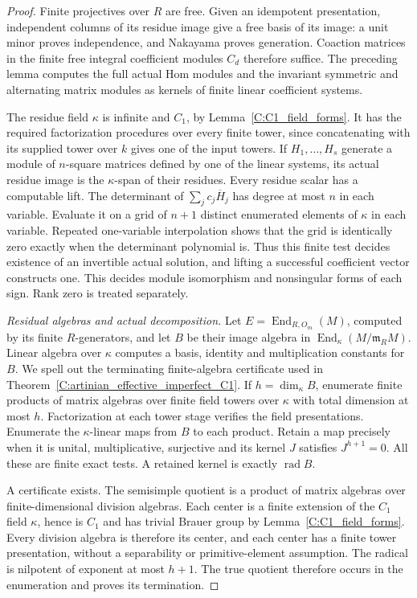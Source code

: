 \begin{proof}
Finite projectives over $R$ are free.
Given an idempotent presentation, independent
columns of its residue image give a free basis
of its image: a unit minor proves independence,
and Nakayama proves generation.
Coaction matrices in the finite free integral
coefficient modules $C_d$ therefore suffice.
The preceding lemma computes the full actual
Hom modules and the invariant symmetric and
alternating matrix modules as kernels of
finite linear coefficient systems.

The residue field $\kappa$ is infinite and
$C_1$, by Lemma~\ref{C:C1_field_forms}.
It has the required factorization procedures
over every finite tower, since concatenating
with its supplied tower over $k$ gives one
of the input towers.
If $H_1,\ldots,H_s$ generate a module of
$n$-square matrices defined by one of the
linear systems, its actual residue image
is the $\kappa$-span of their residues.
Every residue scalar has a computable lift.
The determinant of $\sum_jc_j\overline H_j$
has degree at most $n$ in each variable.
Evaluate it on a grid of $n+1$ distinct
enumerated elements of $\kappa$ in each
variable.  Repeated one-variable interpolation
shows that the grid is identically zero
exactly when the determinant polynomial is.
Thus this finite test decides existence of
an invertible actual solution, and lifting
a successful coefficient vector constructs
one.  This decides module isomorphism and
nonsingular forms of each sign.  Rank zero
is treated separately.

\emph{Residual algebras and actual decomposition.}
Let $E=\operatorname{End}_{R,O_m}(M)$, computed
by its finite $R$-generators, and let $B$ be
their image algebra in
$\operatorname{End}_{\kappa}(M/\mathfrak m_RM)$.
Linear algebra over $\kappa$ computes a basis,
identity and multiplication constants for $B$.
We spell out the terminating finite-algebra
certificate used in
Theorem~\ref{C:artinian_effective_imperfect_C1}.
If $h=\dim_\kappa B$, enumerate finite products
of matrix algebras over finite field towers
over $\kappa$ with total dimension at most $h$.
Factorization at each tower stage verifies
the field presentations.  Enumerate the
$\kappa$-linear maps from $B$ to each product.
Retain a map precisely when it is unital,
multiplicative, surjective and its kernel
$J$ satisfies $J^{h+1}=0$.
All these are finite exact tests.
A retained kernel is exactly
$\operatorname{rad}B$.

A certificate exists.  The semisimple
quotient is a product of matrix algebras
over finite-dimensional division algebras.
Each center is a finite extension of the
$C_1$ field $\kappa$, hence is $C_1$ and
has trivial Brauer group by
Lemma~\ref{C:C1_field_forms}.
Every division algebra is therefore its
center, and each center has a finite tower
presentation, without a separability or
primitive-element assumption.
The radical is nilpotent of exponent at
most $h+1$.  The true quotient therefore
occurs in the enumeration and proves its
termination.


\end{proof}
